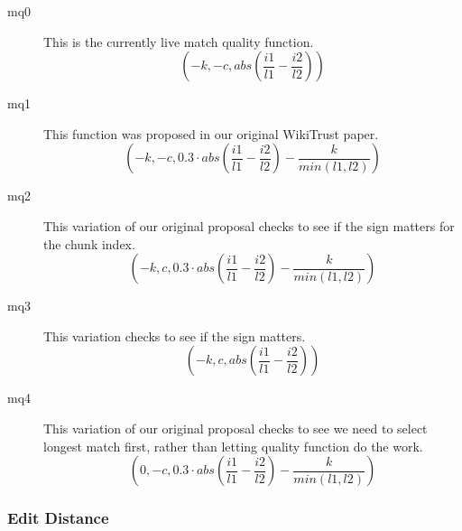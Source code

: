 \begin{description}
\item[mq0] This is the currently live match quality function.
	\begin{equation}
	(-k, -c, abs(\frac{i1}{l1} - \frac{i2}{l2}))
	\end{equation}

\item[mq1] This function was proposed in our original WikiTrust paper.
\begin{equation}
(-k, -c, 0.3  \cdot abs(\frac{i1}{l1} - \frac{i2}{l2}) - \frac{k}{min(l1,l2)})
\end{equation}

\item[mq2] This variation of our original proposal checks to see if the
	sign matters for the chunk index.
\begin{equation}
(-k, c, 0.3  \cdot abs(\frac{i1}{l1} - \frac{i2}{l2}) - \frac{k}{min(l1,l2)})
\end{equation}

\item[mq3] This variation checks to see if the sign matters.
	\begin{equation}
	(-k, c, abs(\frac{i1}{l1} - \frac{i2}{l2}))
	\end{equation}

\item[mq4] This variation of our original proposal checks to see
	we need to select longest match first, rather than letting
	quality function do the work.
\begin{equation}
(0, -c, 0.3  \cdot abs(\frac{i1}{l1} - \frac{i2}{l2}) - \frac{k}{min(l1,l2)})
\end{equation}

\end{description}


\subsubsection{Edit Distance}

